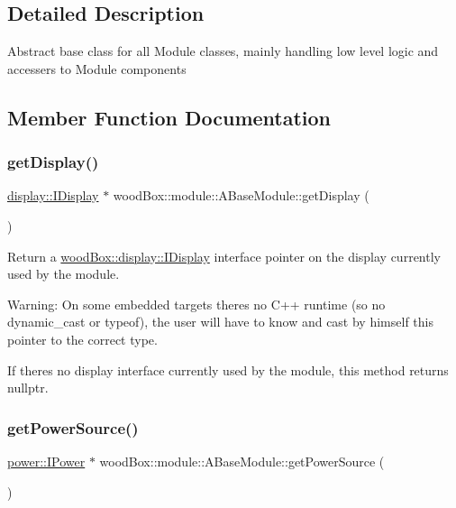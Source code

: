 \subsection{Detailed Description}
Abstract base class for all Module classes, mainly handling low level logic and accessers to Module components 

\subsection{Member Function Documentation}
\mbox{\label{classwood_box_1_1module_1_1_a_base_module_afecd89a2ed85517a6d72ad2f03ea87c3}} 
\subsubsection{\texorpdfstring{get\+Display()}{getDisplay()}}
{\footnotesize\ttfamily \mbox{\hyperlink{classwood_box_1_1display_1_1_i_display}{display\+::\+I\+Display}} $\ast$ wood\+Box\+::module\+::\+A\+Base\+Module\+::get\+Display (\begin{DoxyParamCaption}{ }\end{DoxyParamCaption})}

Return a \mbox{\hyperlink{classwood_box_1_1display_1_1_i_display}{wood\+Box\+::display\+::\+I\+Display}} interface pointer on the display currently used by the module.

Warning\+: On some embedded targets there\textquotesingle{}s no C++ runtime (so no {\ttfamily dynamic\+\_\+cast} or {\ttfamily typeof}), the user will have to know and cast by himself this pointer to the correct type.

If there\textquotesingle{}s no display interface currently used by the module, this method returns {\ttfamily nullptr}. \mbox{\label{classwood_box_1_1module_1_1_a_base_module_a1d67c7b9560b30774878e5b882c4bf0a}} 
\subsubsection{\texorpdfstring{get\+Power\+Source()}{getPowerSource()}}
{\footnotesize\ttfamily \mbox{\hyperlink{classwood_box_1_1power_1_1_i_power}{power\+::\+I\+Power}} $\ast$ wood\+Box\+::module\+::\+A\+Base\+Module\+::get\+Power\+Source (\begin{DoxyParamCaption}{ }\end{DoxyParamCaption})}

